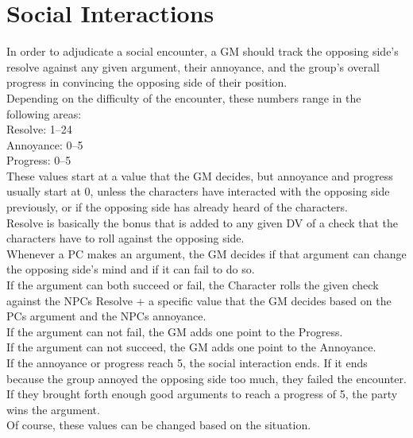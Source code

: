 \chapter{Social Interactions}\label{ch:socialInteractions}
In order to adjudicate a social encounter, a GM should track the opposing side's resolve against any given argument, their annoyance, and the group's overall progress in convincing the opposing side of their position. \\
Depending on the difficulty of the encounter, these numbers range in the following areas:\\
Resolve: 1--24\\
Annoyance: 0--5\\
Progress: 0--5\\
These values start at a value that the GM decides, but annoyance and progress usually start at 0, unless the characters have interacted with the opposing side previously, or if the opposing side has already heard of the characters.\\
Resolve is basically the bonus that is added to any given DV of a check that the characters have to roll against the opposing side.\\
Whenever a PC makes an argument, the GM decides if that argument can change the opposing side's mind and if it can fail to do so.\\
If the argument can both succeed or fail, the Character rolls the given check against the NPCs Resolve + a specific value that the GM decides based on the PCs argument and the NPCs annoyance.\\
If the argument can not fail, the GM adds one point to the Progress.\\
If the argument can not succeed, the GM adds one point to the Annoyance.\\
If the annoyance or progress reach 5, the social interaction ends.
If it ends because the group annoyed the opposing side too much, they failed the encounter.
If they brought forth enough good arguments to reach a progress of 5, the party wins the argument.\\
Of course, these values can be changed based on the situation.